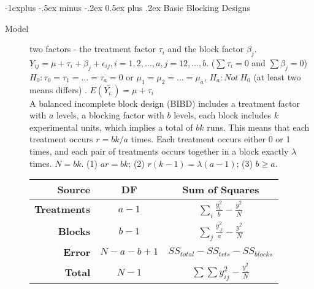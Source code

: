 \documentclass[10pt,landscape]{article}
\makeatletter
\renewcommand{\subsection}{\@startsection{subsection}{2}{0mm}%
                                {-1explus -.5ex minus -.2ex}%
                                {0.5ex plus .2ex}%
                                {\normalfont\normalsize\bfseries}}
\makeatother
\begin{document}
\begin{multicols}{3}
\subsection{Basic Blocking Designs}
	\begin{description}
		\item[Model] two factors - the treatment factor $\tau_i$ and the block factor $\beta_j$. \\
		$Y_{ij} = \mu + \tau_i + \beta	_j + \epsilon_{ij}, i = 1,2,...,a, j = 12,...,b$. ($\sum \tau_i = 0$ and $\sum \beta_j = 0$)\\
		$H_0: \tau_0 = \tau_1 = ... = \tau_a = 0$ or $\mu_1 = \mu_2 = ... = \mu_a$, $H_a: Not\ H_0$ (at least two means differs) . $E(\bar{Y_{i.}}) = \mu + \tau_i$\\%
		A balanced incomplete block design (BIBD) includes a treatment factor with $a$ levels, a blocking factor with  $b$ levels, each block includes $k$ experimental units, which implies a total of $bk$ runs. This means that each treatment occurs $r = bk/a$ times. Each treatment occurs either 0 or 1 times, and each pair of treatments occurs together in a block exactly $\lambda$ times.  $N = bk$. (1) $ar = bk$; (2) $r(k-1) = \lambda (a-1)$; (3) $b\geq a$. \\
		    \begin{center}
            \begin{tabular}{r|cc}
                \textbf{Source}  & \textbf{DF} & \textbf{Sum of Squares}  \\ \hline
                \textbf{Treatments} & $a-1$ & $\sum_i \frac{y_{i.}^2}{b} - \frac{y_{..}^2}{N}$ \\
                \textbf{Blocks} & $b-1$ & $\sum_j \frac{y_{.j}^2}{a} - \frac{y_{..}^2}{N}$ \\
                \textbf{Error} & $N-a-b+1$ & $SS_{total} - SS_{trts} - SS_{blocks}$ \\
                \hline
                \textbf{Total} & $N-1$ & $\sum \sum y_{ij}^2 - \frac{y_{..}^2}{N}$ \\

\end{tabular}
\end{center}
\end{description}
\end{multicols}
\end{document}
